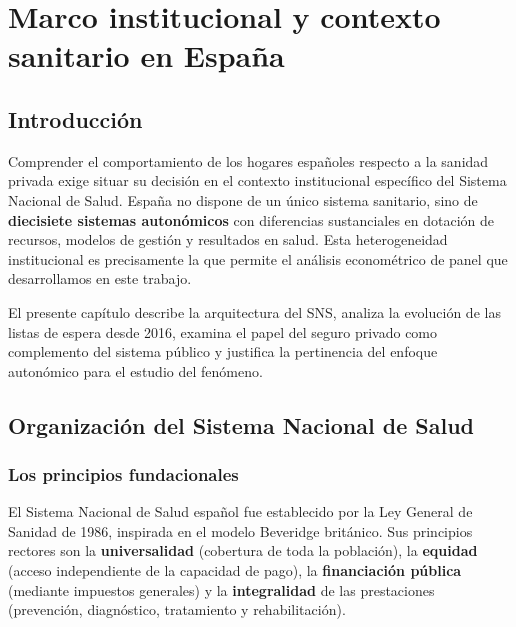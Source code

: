 \chapter{Marco institucional y contexto sanitario en España}
\label{cap:contexto}

\section{Introducción}

Comprender el comportamiento de los hogares españoles respecto a la sanidad
privada exige situar su decisión en el contexto institucional específico del
Sistema Nacional de Salud. España no dispone de un único sistema sanitario, sino
de \textbf{diecisiete sistemas autonómicos} con diferencias sustanciales en
dotación de recursos, modelos de gestión y resultados en salud. Esta heterogeneidad
institucional es precisamente la que permite el análisis econométrico de panel que
desarrollamos en este trabajo. 

El presente capítulo describe la arquitectura del SNS, analiza la evolución de las
listas de espera desde 2016, examina el papel del seguro privado como complemento
del sistema público y justifica la pertinencia del enfoque autonómico para el
estudio del fenómeno.

\section{Organización del Sistema Nacional de Salud}

\subsection{Los principios fundacionales}

El Sistema Nacional de Salud español fue establecido por la Ley General de
Sanidad de 1986, inspirada en el modelo Beveridge británico. Sus principios
rectores son la \textbf{universalidad} (cobertura de toda la población), la
\textbf{equidad} (acceso independiente de la capacidad de pago), la
\textbf{financiación pública} (mediante impuestos generales) y la
\textbf{integralidad} de las prestaciones (prevención, diagnóstico, tratamiento y
rehabilitación).

